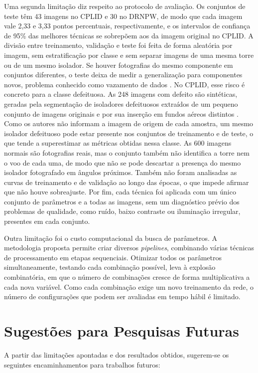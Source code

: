 Uma segunda limitação diz respeito ao protocolo de avaliação. Os conjuntos de teste têm 43 imagens no CPLID e 30 no DRNPW, de modo que cada imagem vale 2,33 e 3,33 pontos percentuais, respectivamente, e os intervalos de confiança de 95\% das melhores técnicas se sobrepõem aos da imagem original no CPLID. A divisão entre treinamento, validação e teste foi feita de forma aleatória por imagem, sem estratificação por classe e sem separar imagens de uma mesma torre ou de um mesmo isolador. Se houver fotografias do mesmo componente em conjuntos diferentes, o teste deixa de medir a generalização para componentes novos, problema conhecido como vazamento de dados \cite{kaufman2012leakage}. No CPLID, esse risco é concreto para a classe defeituosa. As 248 imagens com defeito são sintéticas, geradas pela segmentação de isoladores defeituosos extraídos de um pequeno conjunto de imagens originais e por sua inserção em fundos aéreos distintos \cite{tao2020cplid}. Como os autores não informam a imagem de origem de cada amostra, um mesmo isolador defeituoso pode estar presente nos conjuntos de treinamento e de teste, o que tende a superestimar as métricas obtidas nessa classe. As 600 imagens normais são fotografias reais, mas o conjunto também não identifica a torre nem o voo de cada uma, de modo que não se pode descartar a presença do mesmo isolador fotografado em ângulos próximos. Também não foram analisadas as curvas de treinamento e de validação ao longo das épocas, o que impede afirmar que não houve sobreajuste. Por fim, cada técnica foi aplicada com um único conjunto de parâmetros e a todas as imagens, sem um diagnóstico prévio dos problemas de qualidade, como ruído, baixo contraste ou iluminação irregular, presentes em cada conjunto.

Outra limitação foi o custo computacional da busca de parâmetros. A metodologia proposta permite criar diversos \textit{pipelines}, combinando várias técnicas de processamento em etapas sequenciais. Otimizar todos os parâmetros simultaneamente, testando cada combinação possível, leva à explosão combinatória, em que o número de combinações cresce de forma multiplicativa a cada nova variável. Como cada combinação exige um novo treinamento da rede, o número de configurações que podem ser avaliadas em tempo hábil é limitado.

\section{Sugestões para Pesquisas Futuras}
A partir das limitações apontadas e dos resultados obtidos, sugerem-se os seguintes encaminhamentos para trabalhos futuros:

